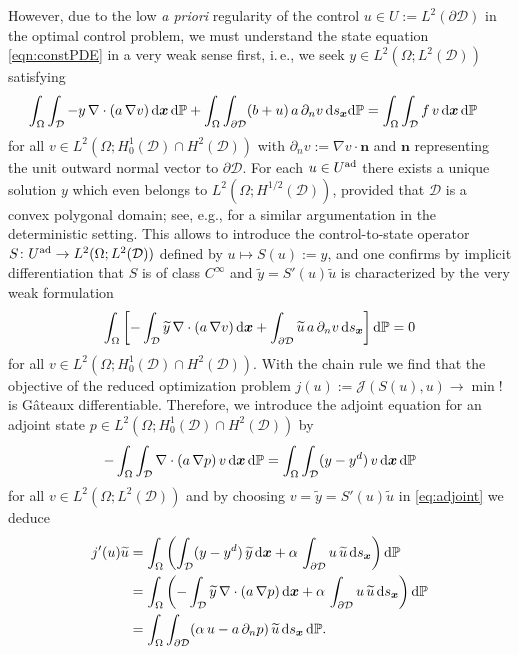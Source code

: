\documentclass[a4paper,10pt]{article}
\newcommand{\bx}{{\boldsymbol{x}}}
\newcommand{\cD}{{\mathcal{D}}}
\renewcommand{\P}{{\mathbb{P}}}
\renewcommand{\d}{\textup{d}}
\numberwithin{theorem}{section}
\begin{document}
However, due to the low \emph{a priori} regularity of the control $u\in U:= L^2(\partial \cD)$ in the optimal control problem, we must understand  the state equation \eqref{eqn:constPDE} in a very weak sense first, i.\,e., we seek $y \in L^2(\Omega; L^2(\cD))$ satisfying
\begin{align}\label{eqn:state_weak}
  \int_\Omega \int_\cD - y \, \nabla \cdot (a\, \nabla v) \,\d \bx \, \d \P & + \int_\Omega \int_{\partial\cD} (b+u)\, a \,  \partial_n v\,\d s_\bx
  \d \P = \int_\Omega \int_\cD f\,v \,\d \bx \, \d \P
\end{align}
for all $v\in L^2(\Omega; H_0^1(\cD) \cap H^2(\cD))$ with $\partial_n v := \nabla v \cdot \mathbf{n}$ and $\mathbf{n}$ representing the unit outward normal vector to $\partial \cD$. For each $u\in U^{\textup{ad}}$ there exists a unique solution $y$ which even belongs to $L^2(\Omega; H^{1/2}(\cD))$, provided that $\cD$ is a convex polygonal domain; see, e.g., \cite{ECasas_1985} for a similar argumentation in the deterministic setting. This allows to introduce the control-to-state operator $S\colon U^{\textup{ad}} \to L^2(\Omega; L^2(\cD))$ defined by  $u\mapsto S(u) := y$, and one confirms by implicit differentiation that $S$ is of class $C^\infty$ and $\widetilde y = S'(u) \widetilde u$ is characterized by the very weak formulation
\begin{equation*}
  \int_\Omega\left[-\int_\cD \widetilde y \, \nabla \cdot (a\, \nabla v) \, \d \bx + \int_{\partial\cD} \widetilde u \, a \,  \partial_n v \, \d s_\bx \right] \d\P = 0
\end{equation*}
for all $v\in L^2(\Omega; H_0^1(\cD) \cap H^2(\cD))$.  With the chain rule we find that the objective of the reduced optimization problem $j(u) := \mathcal{J}(S(u),u)\to\min!$ is G\^ateaux differentiable.
Therefore, we introduce the adjoint equation for an adjoint state $p\in L^2(\Omega;H_0^1(\cD)\cap H^2(\cD))$ by
\begin{equation}\label{eq:adjoint}
  -\int_\Omega \int_\cD \nabla \cdot (a\, \nabla p) \, v \,\d \bx\,\d\P = \int_\Omega\int_\cD (y-y^d)\,v\,\d\bx\,\d\P
\end{equation}
for all $v\in L^2(\Omega; L^2(\cD))$ and by choosing 
$v=\widetilde y = S'(u)\widetilde u$ in \eqref{eq:adjoint} we deduce
\begin{align}\label{eq:derivative_reduced_begin}
  j'(u)\widetilde u &= \int_\Omega \left(\int_\cD (y - y^d)\,\widetilde y\,\d \bx
                  + \alpha\,\int_{\partial\cD}u\,\widetilde u\,\d s_\bx \right)\d\P
                  \nonumber\\
                &= \int_\Omega\left( -\int_\cD \widetilde y \, \nabla \cdot (a\, \nabla p) \,\d \bx
                  + \alpha\,\int_{\partial\cD} u\,\widetilde u\,\d s_\bx\right)\d\P
                  \nonumber\\
                &= \int_\Omega
                  \int_{\partial\cD} (\alpha\,u - a \, \partial_n p)\,\widetilde u\,\d s_\bx\,\d\P.
\end{align}
\end{document}
